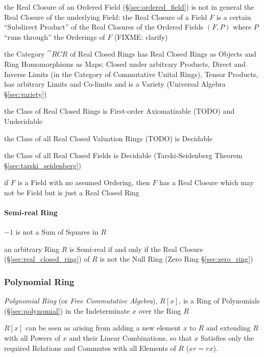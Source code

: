 the Real Closure of an Ordered Field (\S\ref{sec:ordered_field}) is not in
general the Real Closure of the underlying Field: the Real Closure of a Field
$F$ is a certain ``Subdirect Product'' of the Real Closures of the Ordered
Fields $(F,P)$ where $P$ ``runs through'' the Orderings of $F$ (FIXME: clarify)

the Category $\cat{RCR}$ of Real Closed Rings has Real Closed Rings as Objects
and Ring Homomorphisms as Maps; Closed under arbitrary Products, Direct and
Inverse Limits (in the Category of Commutative Unital Rings), Tensor Products,
has arbitrary Limits and Co-limits and is a Variety (Universal Algebra
\S\ref{sec:variety})

the Class of Real Closed Rings is First-order Axiomatizable (TODO) and
Undecidable

the Class of all Real Closed Valuation Rings (TODO) is Decidable

the Class of all Real Closed Fields is Decidable (\fist Tarski-Seidenberg
Theorem \S\ref{sec:tarski_seidenberg})

if $F$ is a Field with no assumed Ordering, then $F$ has a Real Closure which
may not be Field but is just a Real Closed Ring



\paragraph{Semi-real Ring}\label{sec:semireal_ring}\hfill

$-1$ is not a Sum of Squares in $R$

an arbitrary Ring $R$ is Semi-real if and only if the Real Closure
(\S\ref{sec:real_closed_ring}) of $R$ is not the Null Ring (Zero Ring
\S\ref{sec:zero_ring})



\subsubsection{Polynomial Ring}\label{sec:polynomial_ring}

\emph{Polynomial Ring} (or \emph{Free Commutative Algebra}), $R[x]$, is a Ring
of Polynomials (\S\ref{sec:polynomial}) in the Indeterminate $x$ over the Ring
$R$

$R[x]$ can be seen as arising from adding a new element $x$ to $R$ and
extending $R$ with all Powers of $x$ and their Linear Combinations, so that $x$
Satisfies only the required Relations and Commutes with all Elements of $R$ ($xr
= rx$).

